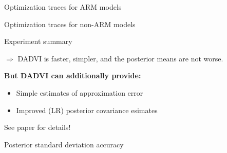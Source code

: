 \documentclass[8pt]{beamer}\usepackage[]{graphicx}\usepackage[]{color}
\begin{document}
\begin{frame}{Optimization traces for ARM models}
    \TracesARM{}
\end{frame}


\begin{frame}{Optimization traces for non-ARM models}
    \TracesNonARM{}
\end{frame}



\begin{frame}{Experiment summary}

$\Rightarrow$ DADVI is faster, simpler, and the posterior means are not worse.

\vspace{3em}
\textbf{But DADVI can additionally provide:}
%
\begin{itemize}
\item Simple estimates of approximation error
\item Improved (LR) posterior covariance esimates
\end{itemize}
%
See paper for details!

\end{frame}



\begin{frame}{Posterior standard deviation accuracy}
    \PosteriorSdAccuracy{}
\end{frame}

\end{document}
